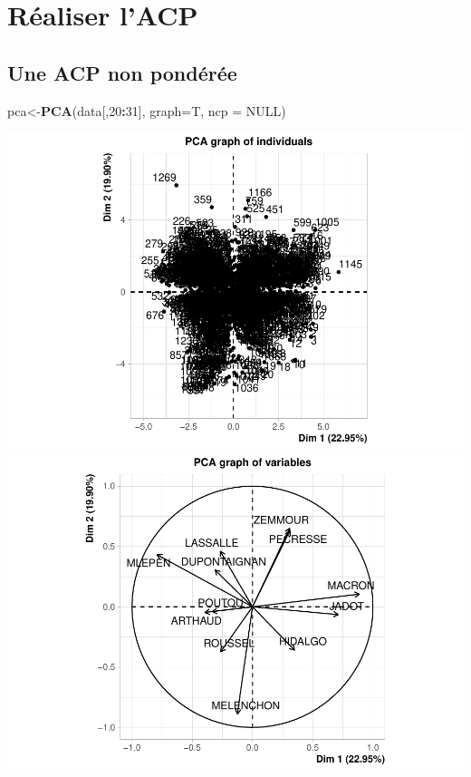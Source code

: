 \documentclass[
]{book}
\newenvironment{Shaded}{\begin{snugshade}}{\end{snugshade}}
\newcommand{\AttributeTok}[1]{\textcolor[rgb]{0.13,0.29,0.53}{#1}}
\newcommand{\ConstantTok}[1]{\textcolor[rgb]{0.56,0.35,0.01}{#1}}
\newcommand{\DecValTok}[1]{\textcolor[rgb]{0.00,0.00,0.81}{#1}}
\newcommand{\FunctionTok}[1]{\textcolor[rgb]{0.13,0.29,0.53}{\textbf{#1}}}
\newcommand{\NormalTok}[1]{#1}
\newcommand{\OtherTok}[1]{\textcolor[rgb]{0.56,0.35,0.01}{#1}}
\newcommand{\SpecialCharTok}[1]{\textcolor[rgb]{0.81,0.36,0.00}{\textbf{#1}}}
\begin{document}
\hypertarget{ruxe9aliser-lacp}{%
\section{Réaliser l'ACP}\label{ruxe9aliser-lacp}}

\hypertarget{une-acp-non-ponduxe9ruxe9e}{%
\subsection{Une ACP non pondérée}\label{une-acp-non-ponduxe9ruxe9e}}

\begin{Shaded}
\begin{Highlighting}[]
\NormalTok{pca}\OtherTok{\textless{}{-}}\FunctionTok{PCA}\NormalTok{(data[,}\DecValTok{20}\SpecialCharTok{:}\DecValTok{31}\NormalTok{], }\AttributeTok{graph=}\NormalTok{T, }\AttributeTok{ncp =} \ConstantTok{NULL}\NormalTok{)}
\end{Highlighting}
\end{Shaded}

\includegraphics{manuel_geo_quanti_files/figure-latex/unnamed-chunk-57-1.pdf} \includegraphics{manuel_geo_quanti_files/figure-latex/unnamed-chunk-57-2.pdf}
\end{document}
